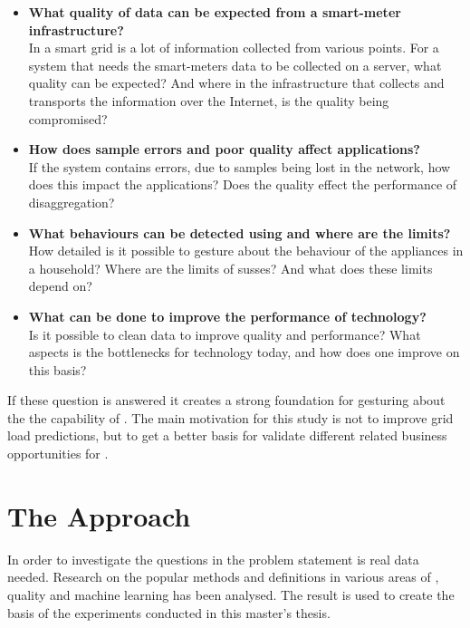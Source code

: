 \begin{itemize}
\item	\textbf{What quality of data can be expected from a smart-meter infrastructure?}\\
In a smart grid is a lot of information collected from various points. For a system that needs the smart-meters data to be collected on a server, what quality can be expected? And where in the infrastructure that collects and transports the information over the Internet, is the quality being compromised? \\
	
	
\item	\textbf{How does sample errors and poor quality affect  applications?}\\
If the system contains errors, due to samples being lost in the network, how does this impact the  applications?  Does the quality effect the performance of  disaggregation? \\
	
\item	\textbf{What behaviours can be detected using  and where are the limits?} \\
How detailed is it possible to gesture about the behaviour of the appliances in a household? Where are the limits of susses? And what does these limits depend on?  \\
	
\item	\textbf{What can be done to improve the performance of  technology?}\\
Is it possible to clean data to improve quality and performance? What aspects is the bottlenecks for  technology today, and how does one improve on this basis? \\

\end{itemize}
If these question is answered it creates a strong foundation for gesturing about the the capability of . The main motivation for this study is not to improve grid load predictions, but to get a better basis for validate different  related business opportunities for .

\section{The Approach}
In order to investigate the questions in the problem statement is real data needed. Research on the popular methods and definitions in various areas of , quality and machine learning has been analysed. The result is used to create the basis of the experiments conducted in this master's thesis. 

